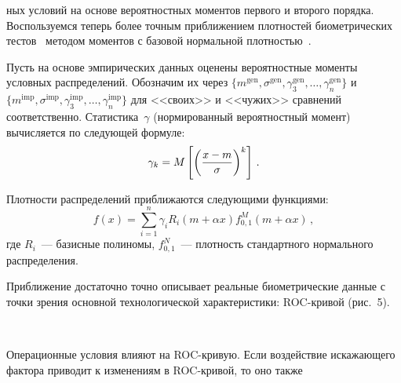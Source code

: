 \begin{multicols}{2}

\noindent
ных условий на основе 
вероятностных моментов первого и второго порядка. Воспользуемся теперь более точным 
приближением плотностей био\-мет\-ри\-че\-ских тестов~\cite{8ar} методом моментов с базовой 
нормальной плотностью~\cite{9ar}. 
  
  Пусть на основе эмпирических данных оценены вероятностные моменты условных 
распределений. Обозначим их через $\{m^{\mathrm{gen}}, \sigma^{\mathrm{gen}}, \gamma_3^{\mathrm{gen}}, \ldots , 
\gamma_n^{\mathrm{gen}}\}$  и $\{m^{\mathrm{imp}}, \sigma^{\mathrm{imp}}, \gamma_3^{\mathrm{imp}}, \ldots , 
\gamma_n^{\mathrm{imp}}\}$ для <<своих>> и <<чужих>> сравнений соответственно. 
Статистика~$\gamma$ (нормированный вероятностный момент) вычисляется по следующей 
формуле:
  \begin{equation*}
  \gamma_k =M\left [ \left (\displaystyle\frac{\displaystyle x-m\mathstrut}{\displaystyle \sigma\mathstrut}\right )^k\right]\,.
  \end{equation*}
  
  Плотности распределений приближаются следующими функциями:
  \begin{equation*}
  f(x) =\sum\limits_{i=1}^n \gamma_i R_i\left (m+\alpha x\right) f^M_{0,1}\left (m+\alpha x\right )\,,
  \end{equation*}
где $R_i$~--- базисные полиномы,  $f_{0,1}^N$~--- плотность стандартного нормального 
распределения.

  Приближение достаточно точно описывает реальные биометрические данные с точки зрения 
основной технологической характеристики: ROC-кри\-вой (рис.~5). 

\setcounter{figure}{5}
\begin{figure*}[b] %
\vspace*{1pt}
\begin{center}
\mbox{%
\epsfxsize=162.398mm
}
\end{center}
\vspace*{-9pt}
\end{figure*}
  
  Операционные условия влияют на ROC-кри\-вую. Если воздействие искажающего фактора 
приводит к изменениям в ROC-кри\-вой, то оно также\linebreak\vspace*{-12pt}
\pagebreak


\end{multicols}

